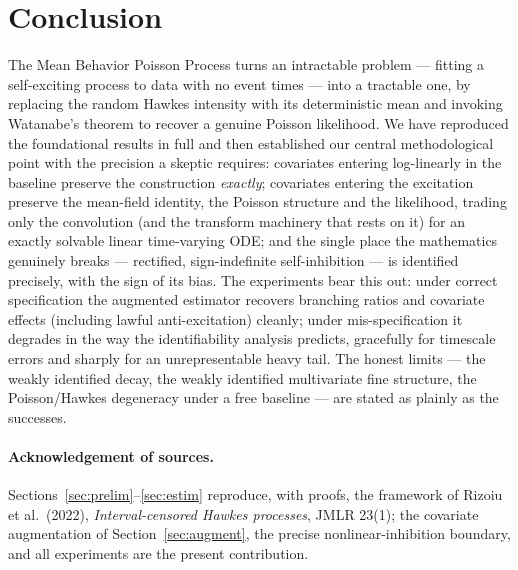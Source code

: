 \documentclass[11pt]{article}
\theoremstyle{plain}
\theoremstyle{definition}
\theoremstyle{remark}
\begin{document}
\section{Conclusion}
\label{sec:conclusion}

The Mean Behavior Poisson Process turns an intractable problem --- fitting a
self-exciting process to data with no event times --- into a tractable one, by
replacing the random Hawkes intensity with its deterministic mean and invoking
Watanabe's theorem to recover a genuine Poisson likelihood. We have reproduced the
foundational results in full and then established our central methodological point
with the precision a skeptic requires: covariates entering log-linearly in the
baseline preserve the construction \emph{exactly}; covariates entering the
excitation preserve the mean-field identity, the Poisson structure and the
likelihood, trading only the convolution (and the transform machinery that rests on
it) for an exactly solvable linear time-varying ODE; and the single place the
mathematics genuinely breaks --- rectified, sign-indefinite self-inhibition --- is
identified precisely, with the sign of its bias. The experiments bear this out: under
correct specification the augmented estimator recovers branching ratios and covariate
effects (including lawful anti-excitation) cleanly; under mis-specification it
degrades in the way the identifiability analysis predicts, gracefully for timescale
errors and sharply for an unrepresentable heavy tail. The honest limits --- the
weakly identified decay, the weakly identified multivariate fine structure, the
Poisson/Hawkes degeneracy under a free baseline --- are stated as plainly as the
successes.

\paragraph{Acknowledgement of sources.}
Sections~\ref{sec:prelim}--\ref{sec:estim} reproduce, with proofs, the framework of
Rizoiu et al.\ (2022), \emph{Interval-censored Hawkes processes}, JMLR 23(1); the
covariate augmentation of Section~\ref{sec:augment}, the precise nonlinear-inhibition
boundary, and all experiments are the present contribution.
\end{document}
